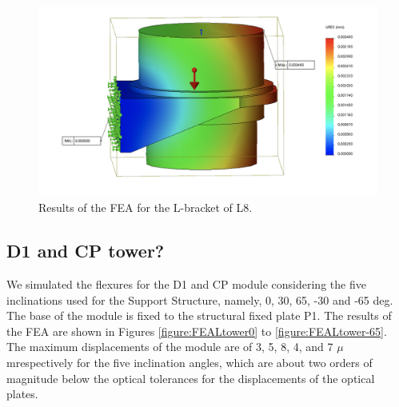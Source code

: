 \documentclass{report}
\newcommand{\micron}{\mbox{$\mu$m}}
\begin{document}
\begin{figure}
\centering
\includegraphics[width=0.8\linewidth]{figures/FEAL8.png}
\caption{Results of the FEA for the L-bracket of L8.}
\label{figure:FEAL8}
\end{figure}




\clearpage

\subsection{D1 and CP  tower?}

We simulated the flexures for the D1 and CP module considering the five inclinations used for the Support Structure, namely, 0, 30, 65, -30 and -65 deg. The base of the module is fixed to the structural fixed plate P1. The results of the FEA are shown in Figures \ref{figure:FEALtower0} to \ref{figure:FEALtower-65}. The maximum displacements of the module are of 3, 5, 8, 4, and 7 \micron  respectively for the five inclination angles, which are about two orders of magnitude below the optical tolerances for the displacements of the optical plates.
\end{document}
